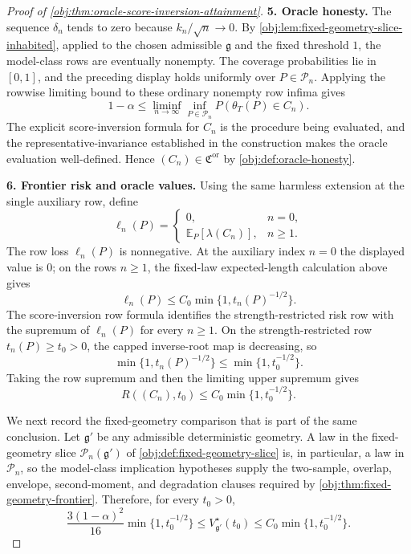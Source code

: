 \begin{proof}[Proof of \cref{obj:thm:oracle-score-inversion-attainment}]
\textbf{5. Oracle honesty.}
The sequence \(\delta_n\) tends to zero because \(k_n/\sqrt n\to0\). By \cref{obj:lem:fixed-geometry-slice-inhabited}, applied to the chosen admissible \(\mathfrak g\) and the fixed threshold \(1\), the model-class rows are eventually nonempty. The coverage probabilities lie in \([0,1]\), and the preceding display holds uniformly over \(P\in\mathcal P_n\). Applying the rowwise limiting bound to these ordinary nonempty row infima gives
\[
1-\alpha
\le
\liminf_{n\to\infty}
\inf_{P\in\mathcal P_n}P(\theta_T(P)\in C_n).
\]
The explicit score-inversion formula for \(C_n\) is the procedure being evaluated, and the representative-invariance established in the construction makes the oracle evaluation well-defined. Hence \((C_n)\in\mathfrak C^{\mathrm{or}}\) by \cref{obj:def:oracle-honesty}. %

\textbf{6. Frontier risk and oracle values.}
Using the same harmless extension at the single auxiliary row, define
\[
\ell_n(P)=
\begin{cases}
0, & n=0,\\
\mathbb E_P[\lambda(C_n)], & n\ge1 .
\end{cases}
\]
The row loss \(\ell_n(P)\) is nonnegative. At the auxiliary index \(n=0\) the displayed value is \(0\); on the rows \(n\ge1\), the fixed-law expected-length calculation above gives
\[
\ell_n(P)
\le
C_0\min\{1,t_n(P)^{-1/2}\}.
\]
The score-inversion row formula identifies the strength-restricted risk row with the supremum of \(\ell_n(P)\) for every \(n\ge1\). On the strength-restricted row \(t_n(P)\ge t_0>0\), the capped inverse-root map is decreasing, so
\[
\min\{1,t_n(P)^{-1/2}\}
\le
\min\{1,t_0^{-1/2}\}.
\]
Taking the row supremum and then the limiting upper supremum gives
\[
R((C_n),t_0)
\le
C_0\min\{1,t_0^{-1/2}\}.
\] %

We next record the fixed-geometry comparison that is part of the same conclusion. Let \(\mathfrak g'\) be any admissible deterministic geometry. A law in the fixed-geometry slice \(\mathcal P_n(\mathfrak g')\) of \cref{obj:def:fixed-geometry-slice} is, in particular, a law in \(\mathcal P_n\), so the model-class implication hypotheses supply the two-sample, overlap, envelope, second-moment, and degradation clauses required by \cref{obj:thm:fixed-geometry-frontier}. Therefore, for every \(t_0>0\),
\[
\frac{3(1-\alpha)^2}{16}
\min\{1,t_0^{-1/2}\}
\le
V_{\mathfrak g'}^\star(t_0)
\le
C_0\min\{1,t_0^{-1/2}\}.
\] %


\end{proof}
